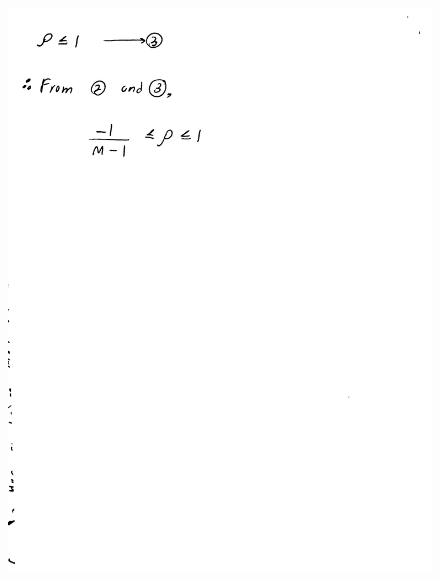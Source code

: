 \documentclass[a4paper,11pt]{article}%
\begin{document}
\begin{figure}[!h]
	\includegraphics[scale=0.22]{figures/img7}
\end{figure}
\end{document}
